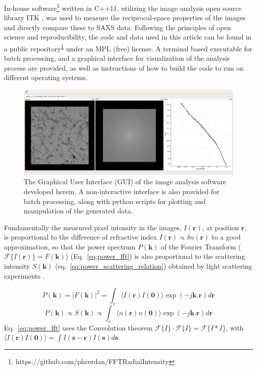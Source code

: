In-house software\footnote{https://github.com/phcerdan/FFTRadialIntensity\label{code}} written in C++11, utilizing the image analysis open source library ITK \cite{johnson_itk_2017}, was used to measure the reciprocal-space properties of the images and directly compare these to SAXS data. Following the principles of open science and reproducibility, the code and data used in this article can be found in a public repository\textsuperscript{\ref{code}} under an MPL (free) license. A terminal based executable for batch processing, and a graphical interface for visualization of the analysis process are provided, as well as instructions of how to build the code to run on different operating systems.

\begin{figure}[!ht]
  \centering
  \includegraphics[width=0.99\linewidth]{Figures/chapter-temsaxs/software_screenshot_stretch.png}
  \caption{The Graphical User Interface (GUI) of the image analysis software developed herein. A non-interactive interface is also provided for batch processing, along with python scripts for plotting and manipulation of the generated data.}\label{fig:fig_gui}
\end{figure}


Fundamentally the measured pixel intensity in the images, $I(\bm{r})$, at position $\bm{r}$, is proportional to the difference of refractive index $I(\bm{r}) \propto \delta n(\bm{r})$  to a good approximation, so that the power spectrum $P(\bm{k})$ of the Fourier Transform ($\mathscr{F}\{I(\bm{r})\} = F(\bm{k})$)  (Eq.~\ref{eq:power_fft}) is also proportional to the scattering intensity $S(\bm{k})$ (eq.~\ref{eq:power_scattering_relation}) obtained by light scattering experiments \cite{tanaka_application_1986}.

\begin{equation}\label{eq:power_fft}
  P(\bm{k}) = |F(\bm{k})|^2 = \int_{v}\langle I(\bm{r})I(\bm{0})\rangle \exp(-j\bm{k}.\bm{r})d\bm{r}
\end{equation}
\begin{equation}\label{eq:power_scattering_relation}
   P(\bm{k}) \propto S(\bm{k}) \propto \int_{v}\langle n(\bm{r})n(\bm{0})\rangle \exp(-j \bm{k}.\bm{r})d\bm{r}
\end{equation}
Eq.~\ref{eq:power_fft} uses the Convolution theorem $\mathscr{F}\{I\} \cdot \mathscr{F}\{I\} = \mathscr{F}\{I*I\} $, with $\langle I(\bm{r})I(\bm{0})\rangle = \int I(\bm{s} - \bm{r})I(\bm{s}) d\bm{s}$.

